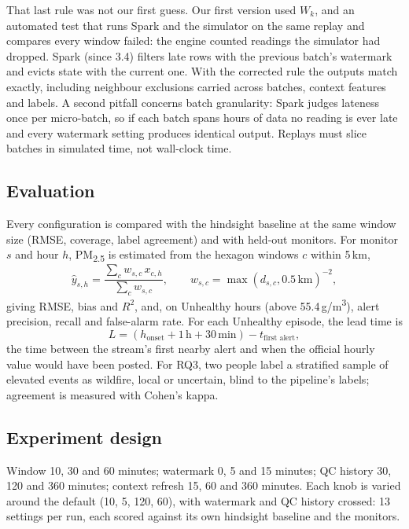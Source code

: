 \documentclass[10pt,journal,compsoc]{IEEEtran}
\newcommand{\ugm}{\,\textmu g/m\textsuperscript{3}}
\begin{document}
That last rule was not our first guess. Our first version used $W_k$, and an automated test that runs Spark and the simulator on the same replay and compares every window failed: the engine counted readings the simulator had dropped. Spark (since 3.4) filters late rows with the previous batch's watermark and evicts state with the current one. With the corrected rule the outputs match exactly, including neighbour exclusions carried across batches, context features and labels. A second pitfall concerns batch granularity: Spark judges lateness once per micro-batch, so if each batch spans hours of data no reading is ever late and every watermark setting produces identical output. Replays must slice batches in simulated time, not wall-clock time.

\subsection{Evaluation}
Every configuration is compared with the hindsight baseline at the same window size (RMSE, coverage, label agreement) and with held-out monitors. For monitor $s$ and hour $h$, PM\textsubscript{2.5} is estimated from the hexagon windows $c$ within 5\,km,
\begin{equation}
\hat y_{s,h} = \frac{\sum_c w_{s,c}\, x_{c,h}}{\sum_c w_{s,c}}, \qquad w_{s,c} = \max(d_{s,c}, 0.5\,\text{km})^{-2},
\end{equation}
giving RMSE, bias and $R^2$, and, on Unhealthy hours (above 55.4\ugm), alert precision, recall and false-alarm rate. For each Unhealthy episode, the lead time is
\begin{equation}
L = (h_{\text{onset}} + 1\,\text{h} + 30\,\text{min}) - t_{\text{first alert}},
\end{equation}
the time between the stream's first nearby alert and when the official hourly value would have been posted. For RQ3, two people label a stratified sample of elevated events as wildfire, local or uncertain, blind to the pipeline's labels; agreement is measured with Cohen's kappa.

\subsection{Experiment design}
Window 10, 30 and 60 minutes; watermark 0, 5 and 15 minutes; QC history 30, 120 and 360 minutes; context refresh 15, 60 and 360 minutes. Each knob is varied around the default (10, 5, 120, 60), with watermark and QC history crossed: 13 settings per run, each scored against its own hindsight baseline and the monitors.
\end{document}
